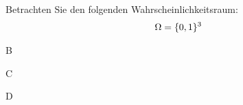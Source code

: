 \documentclass{article}
\begin{document}
\begin{problem}
Betrachten Sie den folgenden Wahrscheinlichkeitsraum:
\[
\begin{array}{>{\displaystyle}l}
\Omega = \{0, 1\}^3 \\
\end{array}
\]
\end{problem}

\begin{solution}
B
\end{solution}

\begin{problem}
C
\end{problem}

\begin{solution}
D
\end{solution}
\end{document}
